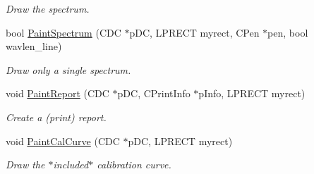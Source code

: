 \begin{DoxyCompactItemize}
\begin{DoxyCompactList}\small\item\em Draw the spectrum. \item\end{DoxyCompactList}\item 
bool \hyperlink{classCSpectrumData_a3969636e2ec9445cd960240b08e7272a}{PaintSpectrum} (CDC $\ast$pDC, LPRECT myrect, CPen $\ast$pen, bool wavlen\_\-line)
\begin{DoxyCompactList}\small\item\em Draw only a single spectrum. \item\end{DoxyCompactList}\item 
void \hyperlink{classCSpectrumData_aa840dcc3e01cd8e642010436bf980847}{PaintReport} (CDC $\ast$pDC, CPrintInfo $\ast$pInfo, LPRECT myrect)
\begin{DoxyCompactList}\small\item\em Create a (print) report. \item\end{DoxyCompactList}\item 
void \hyperlink{classCSpectrumData_a851f02575604b93645947e6b2e3ab2c0}{PaintCalCurve} (CDC $\ast$pDC, LPRECT myrect)
\begin{DoxyCompactList}\small\item\em Draw the $\ast$included$\ast$ calibration curve. \item\end{DoxyCompactList}\end{DoxyCompactItemize}
